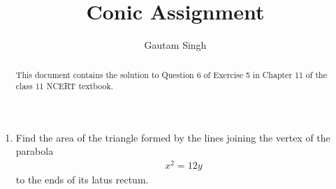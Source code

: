 \documentclass[journal,12pt,twocolumn]{IEEEtran}
\begin{document}
\vspace{3cm}
\title{Conic Assignment}
\author{Gautam Singh}
\maketitle
\bigskip

\begin{abstract}
    This document contains the solution to Question 6 of Exercise 5 in Chapter
    11 of the class 11 NCERT textbook.
\end{abstract}

\begin{enumerate}
    \item Find the area of the triangle formed by the lines joining the vertex 
    of the parabola 
    \begin{align}
        x^2 = 12y
        \label{eq:parabola}
    \end{align}
    to the ends of its latus rectum.


\end{enumerate}
\end{document}
